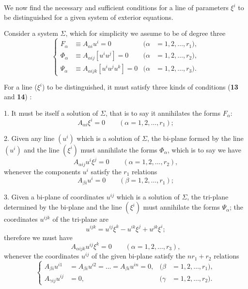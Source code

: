 \documentclass[leqno,11pt]{book}
\numberwithin{equation}{chapter}
\theoremstyle{shape1}
\theoremstyle{shape0}
\theoremstyle{shape2}
\theoremstyle{definition}
\begin{document}
We now find the necessary and sufficient conditions for a line of parameters $\xi^{i}$ to be distinguished for a given system of exterior equations.

Consider a system $\Sigma$, which for simplicity we assume to be of degree three
\begin{equation}
  \label{eq:18}
  \left\{
    \begin{aligned}
      F_{\alpha}&\equiv A_{\alpha i}u^{i}=0&(\alpha&=1,2,\dots,r_{1}),\\
      \Phi_{\alpha}&\equiv A_{\alpha ij}[u^{i}u^{j}]=0&(\alpha&=1,2,\dots,r_{2}),\\
      \Psi_{\alpha}&\equiv A_{\alpha ijk}[u^{i}u^{j}u^{k}]=0&(\alpha&=1,2,\dots,r_{3}).
    \end{aligned}
  \right.
\end{equation}

For a line ($\xi^{i}$) to be distinguished, it must satisfy three kinds of conditions  (\textsection\textbf{13} and \textsection\textbf{14}) :

1. It must be itself a solution of $\Sigma$, that is to say it annihilates the forms $F_{\alpha}$:
\begin{equation}
\label{eq:19}
A_{\alpha i}\xi^{i}=0\qquad (\alpha=1,2,\dots,r_{1});
\end{equation}

2. Given any line $(u^{i})$ which is a solution of $\Sigma$, the bi-plane formed by the line $(u^{i})$ and the line $(\xi^{i})$ must annihilate the forms $\Phi_{\alpha}$, which is to say we have
\begin{equation}
\label{eq:20}
A_{\alpha ij}u^{i}\xi^{j}=0\qquad(\alpha=1,2,\dots,r_{2}),
\end{equation}
whenever the components $u^{i}$ satisfy the $r_{1}$ relations
\begin{equation}
\label{eq:21}
A_{\beta i}u^{i}=0\qquad (\beta=1,2,\dots,r_{1});
\end{equation} 

3. Given a bi-plane of coordinates $u^{ij}$ which is a solution of $\Sigma$, the tri-plane determined by the bi-plane and the line $(\xi^{i})$ must annihilate the forms $\Psi_{\alpha}$; the coordinates $u^{ijk}$ of the tri-plane are
\[
u^{ijk}=u^{ij}\xi^{k}-u^{ik}\xi^{j}+u^{jk}\xi^{i};
\]
therefore we must have
\begin{equation}
\label{eq:22}
  A_{\alpha ijk}u^{ij}\xi^{k}=0\qquad (\alpha=1,2,\dots,r_{3}),
\end{equation}
whenever the coordinates $u^{ij}$ of the given bi-plane satisfy the $nr_{1}+r_{2}$ relations
\begin{equation}
\label{eq:23}
  \left\{
    \begin{aligned}
      A_{\beta i}u^{i1}&=A_{\beta i}u^{i2}=\dots =A_{\beta i}u^{i n}=0,&(\beta&=1,2,\dots,r_{1}),\\
      A_{\gamma ij}u^{ij}&=0,&(\gamma&=1,2,\dots,r_{2}).
    \end{aligned}
  \right.
\end{equation}
\end{document}
